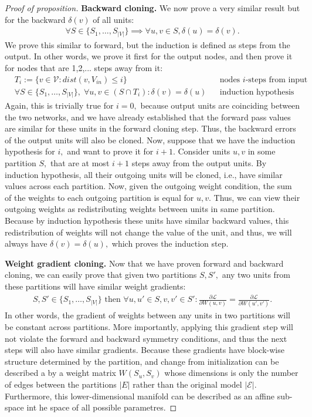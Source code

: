 \documentclass[11pt]{article}
\newcommand{\Loss}{\mathcal{L}}
\begin{document}
\begin{proof}[Proof of proposition]
    \textbf{Backward cloning. } We now prove a very similar result but for the backward $\delta(v)$ of all units:
        \begin{align*}
        \forall S \in \{S_1,\dots,S_{|V|}\} \implies \forall u,v \in S, \delta(u) = \delta(v). 
    \end{align*}
    We prove this similar to forward, but the induction is defined as steps from the output. In other words, we prove it first for the output nodes, and then prove it for nodes that are 1,2,... steps away from it: 
        \begin{align*}
        &T_i:= \{v\in \mathcal{V}: dist(v,V_{in}) \le i\} && \text{nodes $i$-steps from input}\\
        &\forall S \in \{S_1,\dots,S_{|V|}\}, \; \forall u,v \in (S\cap T_i): \delta(v) = \delta(u)  && \text{induction hypothesis}
    \end{align*}
    Again, this is trivially true for $i=0,$ because output units are coinciding between the two networks, and we have already established that the forward pass values are similar for these units in the forward cloning step. Thus, the backward errors of the output units will also be cloned. Now, suppose that we have the induction hypothesis for $i,$ and want to prove it for $i+1.$ Consider units $u,v$ in some partition $S,$ that are at most $i+1$ steps away from the output units. By induction hypothesis, all their outgoing units will be cloned, i.e., have similar values across each partition. Now, given the outgoing weight condition, the sum of the weights to each outgoing partition is equal for $u,v.$ Thus, we can view their outgoing weights as redistributing weights between units in same partition. Because by induction hypothesis these units have similar backward values, this redistribution of weights will not change the value of the unit, and thus, we will always have $\delta(v) = \delta(u),$ which proves the induction step.

    \textbf{Weight gradient cloning.} Now that we have proven forward and backward cloning, we can easily prove that given two partitions $S, S',$ any two units from these partitions will have similar weight gradients:
    \begin{align*}
        S,S' \in \{S_1,\dots, S_{|V|}\} \text{ then } \forall u,u' \in S, v,v'\in S': \frac{\partial \Loss}{\partial W(u,v)}=\frac{\partial \Loss}{\partial W(u',v')}.
    \end{align*}
    In other words, the gradient of weights between any units in two partitions will be constant across partitions. More importantly, applying this gradient step will not violate the forward and backward symmetry conditions, and thus the next steps will also have similar gradients. Because these gradients have block-wise structure determined by the partition, and change from initialization can be described a by a weight matrix $W(S_u,S_v)$ whose dimensions is only the number of edges between the partitions $|E|$ rather than the original model $|\mathcal{E}|$. Furthermore, this lower-dimensional manifold can be described as an affine sub-space int he space of all possible parametres. 
\end{proof}
\end{document}
